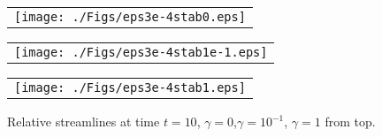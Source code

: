 \documentclass[10pt]{amsart}
\numberwithin{equation}{section}
\theoremstyle{definition}
\theoremstyle{remark}
\renewcommand{\(}{\bigl(}
\renewcommand{\)}{\bigr)}
\begin{document}
\begin{figure}[ht]
\centering
  \begin{tabular}{@{}c@{}}
   \texttt{[image: ./Figs/eps3e-4stab0.eps]}\\
  \end{tabular}
\vspace{-3cm}

  \begin{tabular}{@{}c@{}}
   \texttt{[image: ./Figs/eps3e-4stab1e-1.eps]}\\
  \end{tabular}

    \vspace{-3cm}

  \begin{tabular}{@{}c@{}}
   \texttt{[image: ./Figs/eps3e-4stab1.eps]}\\
  \end{tabular}
		
	\caption{Relative streamlines at time $t=10$, $\gamma=0$,$\gamma=10^{-1}$, $\gamma=1$ from top.}
	\label{fig:vorticity}
\end{figure}
\end{document}
